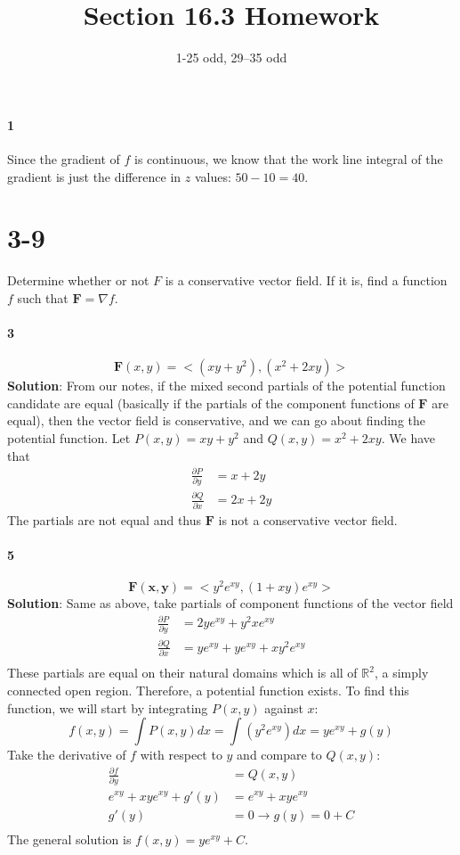 \documentclass{article}
\title{Section 16.3 Homework}
\author{1-25 odd, 29--35 odd}
\date{}
\newcommand{\parf}[2]{\frac{\partial #1}{\partial #2}}
\begin{document}
    \maketitle

    \paragraph{1} Since the gradient of $f$ is continuous, we know that the work line integral of the gradient is just the difference in $z$ values: $50-10=40$.

    \section*{3-9} Determine whether or not $F$ is a conservative vector field.
    If it is, find a function $f$ such that $\mathbf{F} = \nabla f$.

    \paragraph{3}
    \[  \mathbf{F}(x,y) = <(xy+y^2), (x^2+2xy)> \]
    \textbf{Solution}: From our notes, if the mixed second partials of the potential function candidate are equal
    (basically if the partials of the component functions of $\mathbf{F}$ are equal), then the vector field is conservative, and
    we can go about finding the potential function.
    Let $P(x,y) = xy+y^2$ and $Q(x,y) = x^2+2xy$.
    We have that
    \begin{align*}
        \parf{P}{y} &= x + 2y \\
        \parf{Q}{x} &= 2x + 2y
    \end{align*}
    The partials are not equal and thus $\mathbf{F}$ is not a conservative vector field.


    \paragraph{5}
    \[\mathbf{F(x,y)}=<y^{2}e^{xy}, (1+xy)e^{xy}>\]
    \textbf{Solution}: Same as above, take partials of component functions of the vector field
    \begin{align*}
        \parf{P}{y} &= 2ye^{xy} + y^{2}xe^{xy} \\
        \parf{Q}{x} &= ye^{xy} + ye^{xy} + xy^{2}e^{xy}\\
    \end{align*}
    These partials are equal on their natural domains which is all of $\mathbb{R}^2$, a simply connected open region.
    Therefore, a potential function exists.
    To find this function, we will start by integrating $P(x,y)$ against $x$:
    \[f(x,y)=\int P(x,y)dx = \int (y^{2}e^{xy}) dx = ye^{xy} + g(y)\]
    Take the derivative of $f$ with respect to $y$ and compare to $Q(x,y)$:
    \begin{align*}
        \parf{f}{y} &= Q(x,y) \\
        e^{xy} + xye^{xy} + g'(y) &= e^{xy} + xye^{xy} \\
        g'(y) &= 0 \rightarrow g(y) = 0 + C \\
    \end{align*}
    The general solution is $f(x,y) = ye^{xy} + C$.
    
\end{document}
